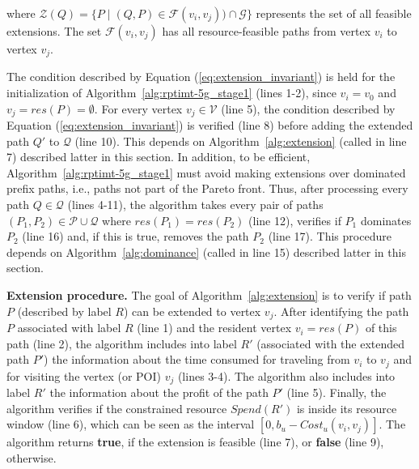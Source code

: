 \noindent where $\mathcal{Z}(Q) = \{P \mid (Q,P) \in \mathcal{F}(v_i,v_j)) \cap \mathcal{G}\}$ represents the set of all feasible extensions. The set $\mathcal{F}(v_i,v_j)$ has all resource-feasible paths from vertex $v_i$ to vertex $v_j$. 

The condition described by Equation (\ref{eq:extension_invariant}) is held for the initialization of Algorithm~\ref{alg:rptimt-5g_stage1} (lines 1-2), since $v_i = v_0$ and $v_j = res(P) = \emptyset$. For every vertex $v_j \in \mathcal{V}$ (line 5), the condition described by Equation (\ref{eq:extension_invariant}) is verified (line 8) before adding the extended path $Q'$ to $\mathcal{Q}$ (line 10). This depends on Algorithm~\ref{alg:extension} (called in line 7) described latter in this section. In addition, to be efficient, Algorithm~\ref{alg:rptimt-5g_stage1} must avoid making extensions over dominated prefix paths, i.e., paths not part of the Pareto front. Thus, after processing every path $Q \in \mathcal{Q}$ (lines 4-11), the algorithm takes every pair of paths $(P_1,P_2) \in \mathcal{P} \cup \mathcal{Q}$ where $res(P_1) = res(P_2)$ (line 12), verifies if $P_1$ dominates $P_2$ (line 16) and, if this is true, removes the path $P_2$ (line 17). This procedure depends on Algorithm~\ref{alg:dominance} (called in line 15) described latter in this section.

\noindent\textbf{Extension procedure.} The goal of Algorithm~\ref{alg:extension} is to verify if path $P$ (described by label $R$) can be extended to vertex $v_j$. After identifying the path $P$ associated with label $R$ (line 1) and the resident vertex $v_i = res(P)$ of this path (line 2), the algorithm includes into label $R'$ (associated with the extended path $P'$) the information about the time consumed for traveling from $v_i$ to $v_j$ and for visiting the vertex (or POI) $v_j$ (lines 3-4). The algorithm also includes into label $R'$ the information about the profit of the path $P'$ (line 5). Finally, the algorithm verifies if the constrained resource $Spend(R')$ is inside its resource window (line 6), which can be seen as the interval $[ 0, b_u - Cost_{u}(v_i,v_j) ]$. The algorithm returns \textbf{true}, if the extension is feasible (line 7), or \textbf{false} (line 9), otherwise.

